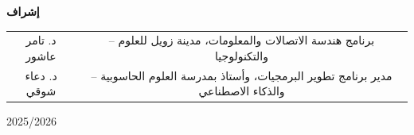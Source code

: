 \begin{singlespace}
\begin{Arabic}
\begin{center}
\vspace{0.8cm}

{\large\bfseries إشراف}

\vspace{0.3cm}

\begin{tabular}{c c}
د. تامر عاشور & -- \textarabic{برنامج هندسة الاتصالات والمعلومات، مدينة زويل للعلوم والتكنولوجيا} \\
د. دعاء شوقي  & -- \textarabic{مدير برنامج تطوير البرمجيات، وأستاذ بمدرسة العلوم الحاسوبية والذكاء الاصطناعي} \\
\end{tabular}

\vspace{0.9cm}

{\large 2025/2026}

\end{center}
\end{Arabic}
\end{singlespace}

\clearpage
